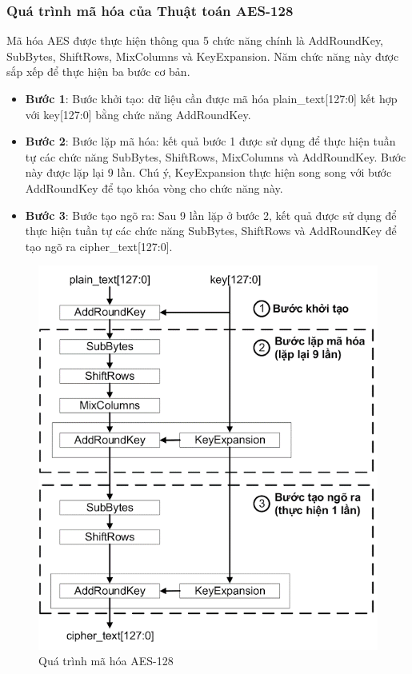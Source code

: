 \subsubsection{Quá trình mã hóa của Thuật toán AES-128}
Mã hóa AES được thực hiện thông qua 5 chức năng chính là AddRoundKey, SubBytes, ShiftRows, MixColumns và KeyExpansion. Năm chức năng này được sắp xếp để thực hiện ba bước cơ bản.
\begin{itemize}
    \item \textbf{Bước 1}: Bước khởi tạo: dữ liệu cần được mã hóa plain\_text[127:0] kết hợp với key[127:0] bằng chức năng AddRoundKey.
    \item \textbf{Bước 2}: Bước lặp mã hóa: kết quả bước 1 được sử dụng để thực hiện tuần tự các chức năng SubBytes, ShiftRows, MixColumns và AddRoundKey. Bước này được lặp lại 9 lần. Chú ý, KeyExpansion thực hiện song song với bước AddRoundKey để tạo khóa vòng cho chức năng này.
    \item \textbf{Bước 3}: Bước tạo ngõ ra: Sau 9 lần lặp ở bước 2, kết quả được sử dụng để thực hiện tuần tự các chức năng SubBytes, ShiftRows và AddRoundKey để tạo ngõ ra cipher\_text[127:0].
\end{itemize}
\begin{figure}[H]
    \centering
    \includegraphics[width=\textwidth]{Ảnh/hiền/mã hóa aes.png}
    \caption{Quá trình mã hóa AES-128}
\end{figure}
